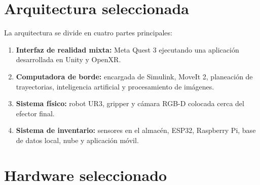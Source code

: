 \documentclass[12pt,letterpaper]{article}
\begin{document}
\section{Arquitectura seleccionada}

La arquitectura se divide en cuatro partes principales:

\begin{enumerate}[leftmargin=1.2cm]

    \item \textbf{Interfaz de realidad mixta:}
    Meta Quest 3 ejecutando una aplicación desarrollada en Unity y OpenXR.

    \item \textbf{Computadora de borde:}
    encargada de Simulink, MoveIt 2, planeación de trayectorias,
    inteligencia artificial y procesamiento de imágenes.

    \item \textbf{Sistema físico:}
    robot UR3, gripper y cámara RGB-D colocada cerca del efector final.

    \item \textbf{Sistema de inventario:}
    sensores en el almacén, ESP32, Raspberry Pi, base de datos local,
    nube y aplicación móvil.

\end{enumerate}

\section{Hardware seleccionado}
\end{document}
